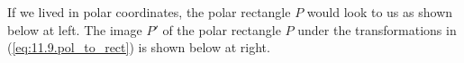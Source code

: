 \begin{activitySolution}
    \item If we lived in polar coordinates, the polar rectangle $P$ would look to us as shown below at left. The image $P'$ of the polar rectangle $P$ under the transformations in (\ref{eq:11.9.pol_to_rect}) is shown below at right.
\begin{center}
\hspace{0.25in}

\end{center}
\end{activitySolution}
